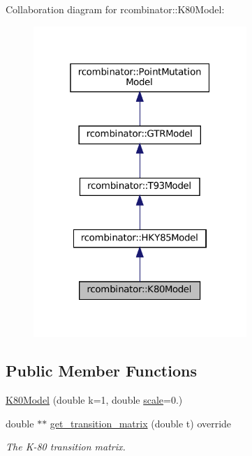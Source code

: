 Collaboration diagram for rcombinator\+:\+:K80\+Model\+:\nopagebreak
\begin{figure}[H]
\begin{center}
\leavevmode
\includegraphics[width=229pt]{classrcombinator_1_1K80Model__coll__graph}
\end{center}
\end{figure}
\subsection*{Public Member Functions}
\begin{DoxyCompactItemize}
\item 
\mbox{\hyperlink{classrcombinator_1_1K80Model_a73baeeb9bbddfcd006e4642f28c95411}{K80\+Model}} (double k=1, double \mbox{\hyperlink{classrcombinator_1_1PointMutationModel_a328a30a438bb1b6a625faa3f714a85c8}{scale}}=0.)
\item 
\mbox{\label{classrcombinator_1_1K80Model_a35aec33b0b090ab23dc7e0985d1bedf5}} 
double $\ast$$\ast$ \mbox{\hyperlink{classrcombinator_1_1K80Model_a35aec33b0b090ab23dc7e0985d1bedf5}{get\+\_\+transition\+\_\+matrix}} (double t) override
\begin{DoxyCompactList}\small\item\em The K-\/80 transition matrix. \end{DoxyCompactList}\end{DoxyCompactItemize}
